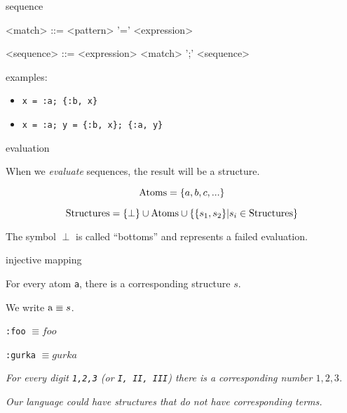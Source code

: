\begin{frame}{sequence}

\begin{grammar}
  <match> ::=  <pattern> '=' <expression>
\end{grammar}

\pause
\begin{grammar}
  <sequence> ::=  <expression> \alt <match> ';' <sequence>
\end{grammar}

\pause\vspace{20pt}

examples:
 \begin{itemize}
   \pause \item {\tt x = :a; \{:b, x\}}
   \pause \item {\tt x = :a; y = \{:b, x\}; \{:a, y\}}
 \end{itemize}

\end{frame}

\begin{frame}{evaluation}

  When we {\em evaluate} sequences, the result will be a structure.
  \pause\vspace{10pt}

$${\rm Atoms} =  \{a,b,c, ...\}$$

$${\rm Structures} = \{\perp\} \cup {\rm Atoms} \cup \{\{s_1, s_2\} | s_i \in {\rm Structures}\}$$

\pause \vspace{20pt}
The symbol $\perp$ is called ``bottoms'' and represents a failed evaluation.

\end{frame}

\begin{frame}{injective mapping}

\pause \vspace{20pt}
For every atom {\tt a}, there is a corresponding structure $s$.

\vspace{10pt}
\hspace{40pt}We write ${\rm a} \equiv s$.

\pause \vspace{10pt}
\hspace{40pt} {\tt :foo} $\equiv foo$

\hspace{40pt} {\tt :gurka} $\equiv gurka$


\pause \vspace{20pt}

{\em For every digit \texttt{1,2,3} (or \texttt{I, II, III}) there is a corresponding number $1,2,3$.}

\pause \vspace{20pt}
{\em Our language could have structures that do not have corresponding terms.}

\end{frame}


